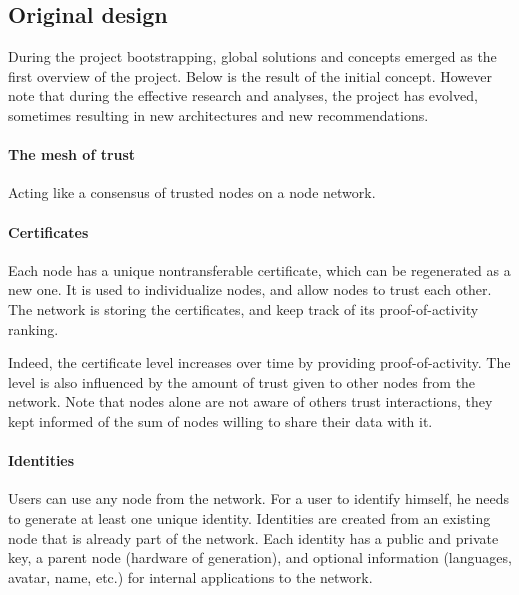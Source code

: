 
\subsection{Original design}
During the project bootstrapping, global solutions and concepts emerged as the first overview of the project. Below is the result of the initial concept. However note that during the effective research and analyses, the project has evolved, sometimes resulting in new architectures and new recommendations.

\paragraph{The mesh of trust}
Acting like a consensus of trusted nodes on a node network.

\paragraph{Certificates} Each node has a unique nontransferable certificate, which can be regenerated as a new one. It is used to individualize nodes, and allow nodes to trust each other. The network is storing the certificates, and keep track of its proof-of-activity\cite{Bentov2013ProofStake} ranking.

Indeed, the certificate level increases over time by providing proof-of-activity. The level is also influenced by the amount of trust given to other nodes from the network. Note that nodes alone are not aware of others trust interactions, they kept informed of the sum of nodes willing to share their data with it.


\paragraph{Identities} Users can use any node from the network. For a user to identify himself, he needs to generate at least one unique identity. Identities are created from an existing node that is already part of the network. Each identity has a public and private key, a parent node (hardware of generation), and optional information (languages, avatar, name, etc.) for internal applications to the network.

